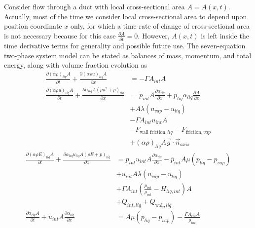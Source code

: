 \begin{itemize}
Consider flow through a duct with local cross-sectional area
$A=A(x,t)$.  Actually, most of the time we consider local
cross-sectional area to depend upon position coordinate $x$ only,
for which a time rate of change of cross-sectional area is not
necessary because for this case $\frac{\partial A}{\partial
t} = 0$.  However, $A(x,t)$ is left inside the time derivative terms
for generality and possible future use.  The seven-equation two-phase
system model can be stated as balances of mass, momentum, and total energy,
along with volume fraction evolution as
\begin{align}
  \label{E-R:74}
  \frac{\partial \left( \alpha \rho \right)_{liq} A}{\partial t}
  + \frac{\partial \left( \alpha \rho u \right)_{liq} A}{\partial x}
  &= - \Gamma A_{int} A
  \\
  \nonumber
  \frac{\partial \left( \alpha \rho u \right)_{liq} A}{\partial t}
  + \frac{\partial \alpha_{liq} A \left( \rho u^2 + p \right)_{liq} }{\partial x}
  &= p_{int} A \frac{\partial \alpha_{liq}}{\partial x} + p_{liq} \alpha_{liq} \frac{\partial A}{\partial x}
  \\
  \nonumber
  &+ A \lambda (u_{vap} - u_{liq})
  \\
  \nonumber
  &- \Gamma A_{int} u_{int} A
  \\
  \nonumber
  &- F_{\text{wall friction}, liq} - F_{\text{friction}, vap}
  \\
  &+ \left( \alpha \rho \right)_{liq} A \vec{g} \cdot \vec{n}_{axis}
\end{align}
\begin{align}
  \nonumber
  \frac{\partial \left( \alpha \rho E \right)_{liq} A}{\partial t}
  + \frac{\partial \alpha_{liq} u_{liq} A \left( \rho E + p \right)_{liq}}{\partial x}
  &= p_{int} u_{int} A \frac{\partial \alpha_{liq}}{\partial x} - \bar{p}_{int} A \mu (p_{liq} - p_{vap})
  \\
  \nonumber
  &+ \bar{u}_{int} A \lambda (u_{vap} - u_{liq})
  \\
  \nonumber
  &+ \Gamma A_{int} \left( \frac{p_{int}}{\rho_{int}} - H_{liq, int} \right) A
  \\
  &+ Q_{int, liq} + Q_{\text{wall}, liq}
  \\
  \label{eqn:7eqn_va_alpha_liq}
  \frac{\partial \alpha_{liq} A}{\partial t} + u_{int} A \frac{\partial \alpha_{liq}}{\partial x}
  &= A \mu (p_{liq} - p_{vap}) - \frac{\Gamma A_{int} A}{\rho_{int}}
\end{align}

\end{itemize}
